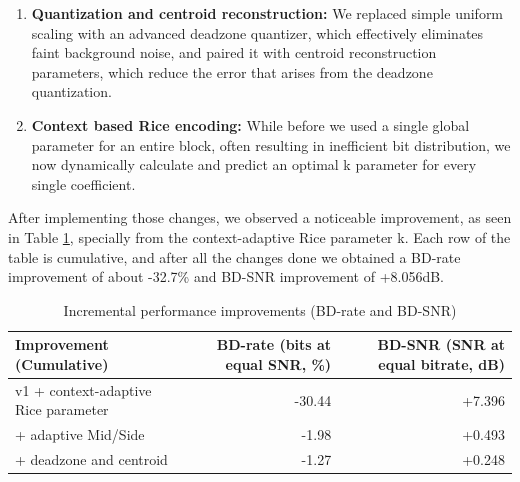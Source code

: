 \begin{enumerate}
    \item \textbf{Quantization and centroid reconstruction:} We replaced simple uniform scaling with an advanced deadzone quantizer, which effectively eliminates faint background noise, and paired it with centroid reconstruction parameters, which reduce the error that arises from the deadzone quantization.

    \item \textbf{Context based Rice encoding:} While before we used a single global parameter for an entire block, often resulting in inefficient bit distribution, we now dynamically calculate and predict an optimal k parameter for every single coefficient.
\end{enumerate}

After implementing those changes, we observed a noticeable improvement, as seen in Table \ref{tab:incremental_improvement}, specially from the context-adaptive Rice parameter k. Each row of the table is cumulative, and after all the changes done we obtained a BD-rate improvement of about -32.7\% and BD-SNR improvement of +8.056dB.


\begin{table}[htbp]
    \centering
    \caption{Incremental performance improvements (BD-rate and BD-SNR)}
    \label{tab:incremental_improvement}
    \small
    \begin{tabular}{lrr}
        \toprule
        \textbf{Improvement (Cumulative)} &
        \textbf{BD-rate (bits at equal SNR, \%)} &
        \textbf{BD-SNR (SNR at equal bitrate, dB)} \\
        \midrule
        v1 + context-adaptive Rice parameter 
        & -30.44 
        & +7.396 \\
        
        + adaptive Mid/Side 
        & -1.98 
        & +0.493 \\
        
        + deadzone and centroid 
        & -1.27 
        & +0.248 \\
        \bottomrule
    \end{tabular}
\end{table}